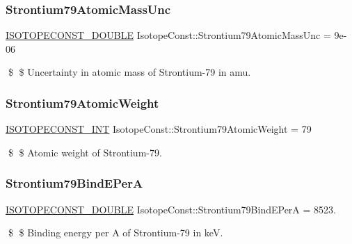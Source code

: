 \subsubsection{\texorpdfstring{Strontium79\+Atomic\+Mass\+Unc}{Strontium79AtomicMassUnc}}
{\footnotesize\ttfamily \mbox{\hyperlink{group___isotope_const-_macros_ga8f45a7272ce02c0b4c65c44636ed719a}{I\+S\+O\+T\+O\+P\+E\+C\+O\+N\+S\+T\+\_\+\+D\+O\+U\+B\+LE}} Isotope\+Const\+::\+Strontium79\+Atomic\+Mass\+Unc = 9e-\/06}

\$ \$ Uncertainty in atomic mass of Strontium-\/79 in amu. \mbox{\label{group___isotope_const-_strontium-_sr79_ga61bd0ac2614608f9481f7fc566315109}} 
\subsubsection{\texorpdfstring{Strontium79\+Atomic\+Weight}{Strontium79AtomicWeight}}
{\footnotesize\ttfamily \mbox{\hyperlink{group___isotope_const-_macros_ga5f18360b3e99483a35c32d789e62621c}{I\+S\+O\+T\+O\+P\+E\+C\+O\+N\+S\+T\+\_\+\+I\+NT}} Isotope\+Const\+::\+Strontium79\+Atomic\+Weight = 79}

\$ \$ Atomic weight of Strontium-\/79. \mbox{\label{group___isotope_const-_strontium-_sr79_ga6b31970376e0015df7c37677734a786a}} 
\subsubsection{\texorpdfstring{Strontium79\+Bind\+E\+PerA}{Strontium79BindEPerA}}
{\footnotesize\ttfamily \mbox{\hyperlink{group___isotope_const-_macros_ga8f45a7272ce02c0b4c65c44636ed719a}{I\+S\+O\+T\+O\+P\+E\+C\+O\+N\+S\+T\+\_\+\+D\+O\+U\+B\+LE}} Isotope\+Const\+::\+Strontium79\+Bind\+E\+PerA = 8523.}

\$ \$ Binding energy per A of Strontium-\/79 in keV. \mbox{\label{group___isotope_const-_strontium-_sr79_gad98604255350994b7b3c6cb7ea84a814}} 

